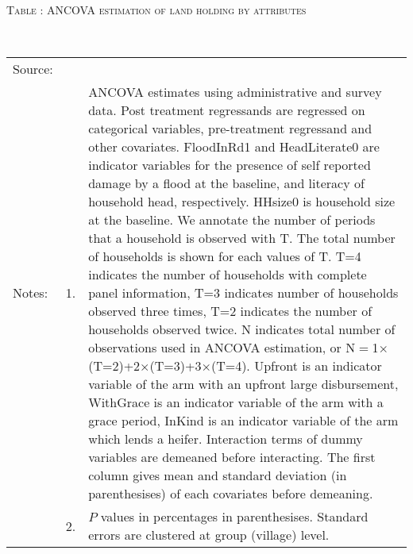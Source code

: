 \hspace{-1cm}\begin{minipage}[t]{14cm}
\hfil\textsc{\normalsize Table \thetable: ANCOVA estimation of land holding by attributes\label{tab ANCOVA land attributes}}\\
\setlength{\tabcolsep}{1pt}
\setlength{\baselineskip}{8pt}
\renewcommand{\arraystretch}{.55}
\hfil{}\\
\renewcommand{\arraystretch}{.8}
\setlength{\tabcolsep}{1pt}
\begin{tabular}{>{\hfill\scriptsize}p{1cm}<{}>{\hfill\scriptsize}p{.25cm}<{}>{\scriptsize}p{12cm}<{\hfill}}
Source:& \multicolumn{2}{l}{\scriptsize Estimated with GUK administrative and survey data.}\\
Notes: & 1. & ANCOVA estimates using administrative and survey data. Post treatment regressands are regressed on categorical variables, pre-treatment regressand and other covariates. \textsf{FloodInRd1} and \textsf{HeadLiterate0} are indicator variables for the presence of self reported damage by a flood at the baseline, and literacy of household head, respectively. \textsf{HHsize0} is household size at the baseline. We annotate the number of periods that a household is observed with \textsf{T}. The total number of households is shown for each values of \textsf{T}. \textsf{T=4} indicates the number of households with complete panel information, \textsf{T=3} indicates number of households observed three times, \textsf{T=2} indicates the number of households observed twice. \textsf{N} indicates total number of observations used in ANCOVA estimation, or \textsf{N$=$1$\times$(T=2)+2$\times$(T=3)+3$\times$(T=4)}.  \textsf{Upfront} is an indicator variable of the arm with an upfront large disbursement, \textsf{WithGrace} is an indicator variable of the arm with a grace period, \textsf{InKind} is an indicator variable of the arm which lends a heifer. Interaction terms of dummy variables are demeaned before interacting. The first column gives mean and standard deviation (in parenthesises) of each covariates before demeaning.\\
& 2. & $P$ values in percentages in parenthesises. Standard errors are clustered at group (village) level.
\end{tabular}
\end{minipage}

